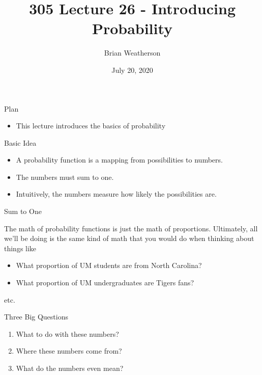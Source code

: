 \documentclass[
  ignorenonframetext,
]{beamer}
\title{305 Lecture 26 - Introducing Probability}
\author{Brian Weatherson}
\date{July 20, 2020}
\providecommand{\tightlist}{%
  \setlength{\itemsep}{0pt}\setlength{\parskip}{0pt}}
\renewcommand{\,}{\text{, }}
\begin{document}
\frame{\titlepage}

\begin{frame}{Plan}
\protect\hypertarget{plan}{}

\begin{itemize}
\tightlist
\item
  This lecture introduces the basics of probability
\end{itemize}

\end{frame}

\begin{frame}{Basic Idea}
\protect\hypertarget{basic-idea}{}

\begin{itemize}
\tightlist
\item
  A probability function is a mapping from possibilities to numbers.
\item
  The numbers must sum to one.
\item
  Intuitively, the numbers measure how likely the possibilities are.
\end{itemize}

\end{frame}

\begin{frame}{Sum to One}
\protect\hypertarget{sum-to-one}{}

The math of probability functions is just the math of proportions.
Ultimately, all we'll be doing is the same kind of math that you would
do when thinking about things like

\begin{itemize}
\tightlist
\item
  What proportion of UM students are from North Carolina?
\item
  What proportion of UM undergraduates are Tigers fans?
\end{itemize}

etc.

\end{frame}

\begin{frame}{Three Big Questions}
\protect\hypertarget{three-big-questions}{}

\begin{enumerate}[<+->]
\tightlist
\item
  What to do with these numbers?
\item
  Where these numbers come from?
\item
  What do the numbers even mean?
\end{enumerate}

\end{frame}
\end{document}
